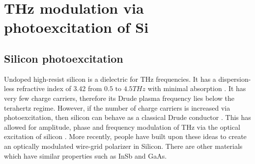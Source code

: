 \section{THz modulation via photoexcitation of Si} \label{sec:THz_mod}

\subsection{Silicon photoexcitation}

Undoped high-resist silicon is a dielectric for THz frequencies. It has a dispersion-less refractive index of 3.42 from $0.5 \mbox{ to } 4.5THz$ with minimal absorption \cite{THzsilicon}. It has very few charge carriers, therefore its Drude plasma frequency lies below the terahertz regime. However, if the number of charge carriers is increased via photoexcitation, then silicon can behave as a classical Drude conductor \cite{Photo.Si}. This has allowed for amplitude, phase and frequency modulation of THz via the optical excitation of silicon \cite{Photo.Si}. More recently, people have built upon these ideas to create an optically modulated wire-grid polarizer \cite{Siopticalpolarizer} in Silicon. There are other materials which have similar properties such as InSb and GaAs.


